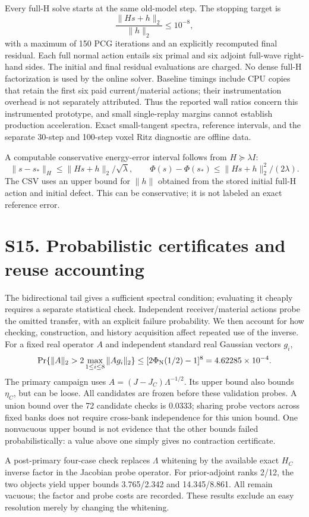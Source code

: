Every full-H solve starts at the same old-model step. The stopping target is
\[
\frac{\|Hs+h\|_2}{\|h\|_2}\le10^{-8},
\]
with a maximum of 150 PCG iterations and an explicitly recomputed final residual. Each full normal action entails six primal and six adjoint full-wave right-hand sides. The initial and final residual evaluations are charged. No dense full-H factorization is used by the online solver. Baseline timings include CPU copies that retain the first six paid current/material actions; their instrumentation overhead is not separately attributed. Thus the reported wall ratios concern this instrumented prototype, and small single-replay margins cannot establish production acceleration. Exact small-tangent spectra, reference intervals, and the separate 30-step and 100-step voxel Ritz diagnostic are offline data.

A computable conservative energy-error interval follows from \(H\succeq\lambda I\):
\[
\|s-s_*\|_H\le\|Hs+h\|_2/\sqrt\lambda,
\qquad \Phi(s)-\Phi(s_*)\le\|Hs+h\|_2^2/(2\lambda).
\]
The CSV uses an upper bound for \(\|h\|\) obtained from the stored initial full-H action and initial defect. This can be conservative; it is not labeled an exact reference error.

\section*{S15. Probabilistic certificates and reuse accounting}
The bidirectional tail gives a sufficient spectral condition; evaluating it cheaply requires a separate statistical check. Independent receiver/material actions probe the omitted transfer, with an explicit failure probability. We then account for how checking, construction, and history acquisition affect repeated use of the inverse.
For a fixed real operator \(A\) and independent standard real Gaussian vectors \(g_i\),
\[
\Pr\{\|A\|_2>2\max_{1\le i\le8}\|Ag_i\|_2\}
\le[2\Phi_{\rm N}(1/2)-1]^8=4.62285\times10^{-4}.
\]
The primary campaign uses \(A=(J-J_C)\Lambda^{-1/2}\). Its upper bound also bounds \(\eta_C\), but can be loose. All candidates are frozen before these validation probes. A union bound over the 72 candidate checks is 0.0333; sharing probe vectors across fixed banks does not require cross-bank independence for this union bound. One nonvacuous upper bound is not evidence that the other bounds failed probabilistically: a value above one simply gives no contraction certificate.

A post-primary four-case check replaces $\Lambda$ whitening by the available exact $H_C$ inverse factor in the Jacobian probe operator. For prior-adjoint ranks 2/12, the two objects yield upper bounds 3.765/2.342 and 14.345/8.861. All remain vacuous; the factor and probe costs are recorded. These results exclude an easy resolution merely by changing the whitening.

